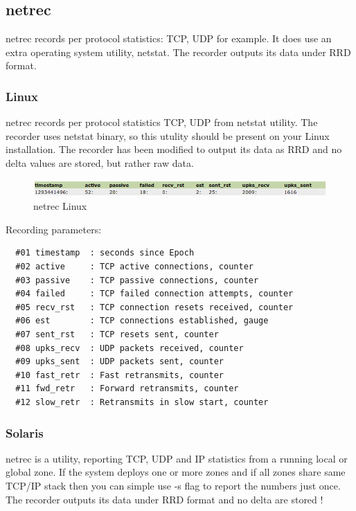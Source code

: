 \subsection*{netrec}
netrec records per protocol statistics: TCP, UDP for example. It does use an 
extra operating system utility, netstat. The recorder outputs its data under 
RRD format.

\subsubsection{Linux}
netrec records per protocol statistics TCP, UDP from netstat utility. The 
recorder uses netstat binary, so this utulity should be present on your Linux
installation. The recorder has been modified to output its data as RRD and no
delta values are stored, but rather raw data.

\begin{figure}[!ht]
\centering
\includegraphics[scale=0.62]{netrec_lin.png}
\caption{netrec Linux}
\label{fig:netrec_lin}
\end{figure}

\noindent
Recording parameters:

\begin{verbatim}
  #01 timestamp  : seconds since Epoch
  #02 active     : TCP active connections, counter
  #03 passive    : TCP passive connections, counter
  #04 failed     : TCP failed connection attempts, counter
  #05 recv_rst   : TCP connection resets received, counter
  #06 est        : TCP connections established, gauge
  #07 sent_rst   : TCP resets sent, counter
  #08 upks_recv  : UDP packets received, counter
  #09 upks_sent  : UDP packets sent, counter
  #10 fast_retr  : Fast retransmits, counter
  #11 fwd_retr   : Forward retransmits, counter
  #12 slow_retr  : Retransmits in slow start, counter
\end{verbatim}




\subsubsection{Solaris}
netrec is a utility, reporting TCP, UDP and IP statistics from a running local
or global zone. If the system deploys one or more zones and if all zones share
same TCP/IP stack then you can simple use -s flag to report the numbers just
once. The recorder outputs its data under RRD format and no delta are stored !

